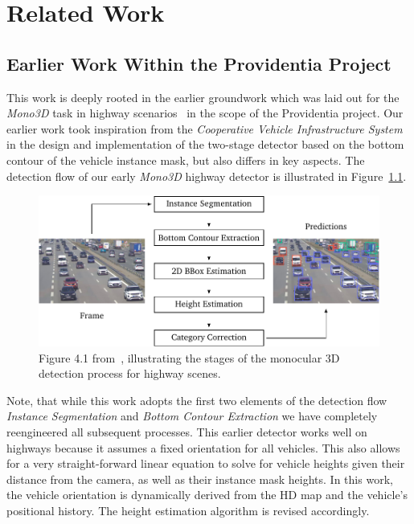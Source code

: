 
\chapter{Related Work}
\label{ch:related}

\section{Earlier Work Within the Providentia Project}
\label{sec:related-leon}

This work is deeply rooted in the earlier groundwork which was laid out for the \textit{Mono3D} task in highway scenarios~\cite{leonthesis} in the scope of the Providentia project.
Our earlier work took inspiration from the \textit{Cooperative Vehicle Infrastructure System}~\cite{guo2021detection} in the design and implementation of the two-stage detector based on the bottom contour of the vehicle instance mask, but also differs in key aspects.
The detection flow of our early \textit{Mono3D} highway detector is illustrated in Figure~\ref{fig:related-leon}.

\begin{figure}[htb]
    \centering
    \includegraphics[width=0.9\linewidth]{figures/thesis_leon_fig_4_1}
    \caption{Figure 4.1 from~\cite{leonthesis}, illustrating the stages of the monocular 3D detection process for highway scenes.}
    \label{fig:related-leon}
\end{figure}

Note, that while this work adopts the first two elements of the detection flow \textemdash \textit{Instance Segmentation} and \textit{Bottom Contour Extraction} \textemdash we have completely reengineered all subsequent processes.
This earlier detector works well on highways because it assumes a fixed orientation for all vehicles.
This also allows for a very straight-forward linear equation to solve for vehicle heights given their distance from the camera, as well as their instance mask heights.
In this work, the vehicle orientation is dynamically derived from the HD map and the vehicle's positional history.
The height estimation algorithm is revised accordingly.

